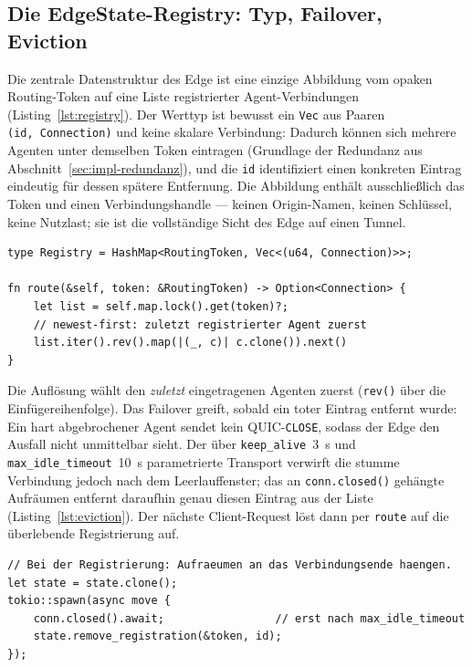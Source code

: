 \subsection{Die EdgeState-Registry: Typ, Failover, Eviction}
\label{sec:impl-registry}

Die zentrale Datenstruktur des Edge ist eine einzige Abbildung vom opaken
Routing-Token auf eine Liste registrierter Agent-Verbindungen
(Listing~\ref{lst:registry}). Der Werttyp ist bewusst ein \texttt{Vec} aus
Paaren \texttt{(id,\ Connection)} und keine skalare Verbindung: Dadurch können
sich mehrere Agenten unter demselben Token eintragen (Grundlage der Redundanz
aus Abschnitt~\ref{sec:impl-redundanz}), und die \texttt{id} identifiziert einen
konkreten Eintrag eindeutig für dessen spätere Entfernung. Die Abbildung enthält
ausschließlich das Token und einen Verbindungshandle --- keinen Origin-Namen,
keinen Schlüssel, keine Nutzlast; sie ist die vollständige Sicht des Edge auf
einen Tunnel.

\begin{lstlisting}[caption={Registry-Typ und Newest-First-Auflösung (gekürzt, \texttt{ct-edge::EdgeState}).},label={lst:registry}]
type Registry = HashMap<RoutingToken, Vec<(u64, Connection)>>;

fn route(&self, token: &RoutingToken) -> Option<Connection> {
    let list = self.map.lock().get(token)?;
    // newest-first: zuletzt registrierter Agent zuerst
    list.iter().rev().map(|(_, c)| c.clone()).next()
}
\end{lstlisting}

Die Auflösung wählt den \emph{zuletzt} eingetragenen Agenten zuerst
(\texttt{rev()} über die Einfügereihenfolge). Das Failover greift, sobald ein
toter Eintrag entfernt wurde: Ein hart abgebrochener Agent sendet kein
QUIC-\texttt{CLOSE}, sodass der Edge den Ausfall nicht unmittelbar sieht. Der
über \texttt{keep\_alive}~3~s und \texttt{max\_idle\_timeout}~10~s parametrierte
Transport verwirft die stumme Verbindung jedoch nach dem Leerlauffenster; das an
\texttt{conn.closed()} gehängte Aufräumen entfernt daraufhin genau diesen
Eintrag aus der Liste (Listing~\ref{lst:eviction}). Der nächste Client-Request
löst dann per \texttt{route} auf die überlebende Registrierung auf.

\begin{lstlisting}[caption={Idle-Timeout-Eviction eines Agenten ohne QUIC-CLOSE (gekürzt, \texttt{ct-edge}).},label={lst:eviction}]
// Bei der Registrierung: Aufraeumen an das Verbindungsende haengen.
let state = state.clone();
tokio::spawn(async move {
    conn.closed().await;                 // erst nach max_idle_timeout
    state.remove_registration(&token, id);
});
\end{lstlisting}

